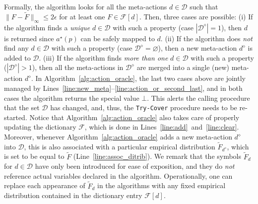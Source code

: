 %
Formally, the algorithm looks for all the meta-actions $d \in \mathcal{D}$ such that $ \| F -   \widetilde F \|_{\infty} \le 2 \epsilon $ for at least one $F \in \mathcal{F}[d]$.
%
Then, three cases are possible:
%
	(i) If the algorithm finds a \emph{unique} $d \in \mathcal{D}$ with such a property (case $|\mathcal{D}^\diamond|=1$), then $d$ is returned since $a^\star(p)$ can be safely mapped to $d$.
	(ii) If the algorithm does \emph{not} find any $d \in \mathcal{D}$ with such a property (case $\mathcal{D}^\diamond=\varnothing$), then a new meta-action $d^\diamond$ is added to $\mathcal{D}$.
	(iii) If the algorithm finds \emph{more than one} $d \in \mathcal{D}$ with such a property ($|\mathcal{D}^\diamond| > 1$), then all the meta-actions in $\mathcal{D}^\diamond$ are merged into a single (new) meta-action $d^\diamond$.
%
%
In Algorithm~\ref{alg:action_oracle}, the last two cases above are jointly managed by Lines~\ref{line:new_meta}--\ref{line:action_or_second_last}, and in both cases the algorithm returns the special value $\bot$.
%
This alerts the calling procedure that the set $\mathcal{D}$ has changed, and, thus, the \texttt{Try-Cover} procedure needs to be re-started.
%
Notice that Algorithm~\ref{alg:action_oracle} also takes care of properly updating the dictionary $\mathcal{F}$, which is done in Lines~\ref{line:add}~and~\ref{line:clear}.
%
Moreover, whenever Algorithm~\ref{alg:action_oracle} adds a new meta-action $d^\diamond$ into $\mathcal{D}$, this is also associated with a particular empirical distribution $\widetilde{F}_{d^\diamond}$, which is set to be equal to $\widetilde{F}$ (Line~\ref{line:assoc_ditrib}).
%
%
We remark that the symbols $\widetilde{F}_d$ for $d \in \mathcal{D}$ have only been introduced for ease of exposition, and they do \emph{not} reference actual variables declared in the algorithm.
%
Operationally, one can replace each appearance of $\widetilde{F}_d$ in the algorithms with any fixed empirical distribution contained in the dictionary entry $\mathcal{F}[d]$.
%
%
%


